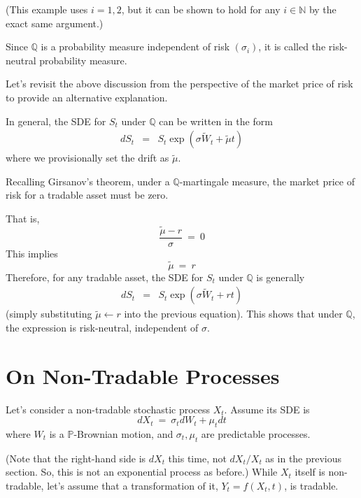 \documentclass[uplatex,a4j,12pt,dvipdfmx]{jsarticle}
\begin{document}
(This example uses $i=1,2$, but it can be shown to hold for any $i \in \mathbb{N}$ by the exact same argument.)

Since $\mathbb{Q}$ is a probability measure independent of risk $(\sigma_{i})$, it is called the risk-neutral probability measure.
${}$

Let's revisit the above discussion from the perspective of the market price of risk to provide an alternative explanation.

In general, the SDE for $S_{t}$ under $\mathbb{Q}$ can be written in the form
%
%
\begin{eqnarray*}
	d S_{t}
	&=&
	S_{t} \exp \left(
	\sigma \tilde{W}_{t}
	+ \tilde{\mu} t
	\right)
\end{eqnarray*}
%
%
where we provisionally set the drift as $\tilde{\mu}$.

Recalling Girsanov's theorem, under a $\mathbb{Q}$-martingale measure, the market price of risk for a tradable asset must be zero.

That is,
$$
	\dfrac{\tilde{\mu} - r}{ \sigma }
	\ = \
	0
$$
This implies
$$
	\tilde{\mu} \ = \ r
$$
Therefore, for any tradable asset, the SDE for $S_{t}$ under $\mathbb{Q}$ is generally
%
%
\begin{eqnarray*}
	d S_{t}
	&=&
	S_{t} \exp \left(
	\sigma \tilde{W}_{t}
	+ r t
	\right)
\end{eqnarray*}
%
%
(simply substituting $\tilde{\mu} \leftarrow r$ into the previous equation).
This shows that under $\mathbb{Q}$, the expression is risk-neutral, independent of $\sigma$.

\section{On Non-Tradable Processes}

Let's consider a non-tradable stochastic process $X_{t}$. Assume its SDE is
$$
	d X_{t}
	\ = \
	\sigma_{t} d W_{t} + \mu_{t} dt
$$
where $W_{t}$ is a $\mathbb{P}$-Brownian motion, and $\sigma_{t}, \mu_{t}$ are predictable processes.

(Note that the right-hand side is $dX_{t}$ this time, not $dX_{t}/X_{t}$ as in the previous section. So, this is not an exponential process as before.)
While $X_{t}$ itself is non-tradable, let's assume that a transformation of it, $Y_{t}=f(X_{t},t)$, is tradable.
\end{document}
